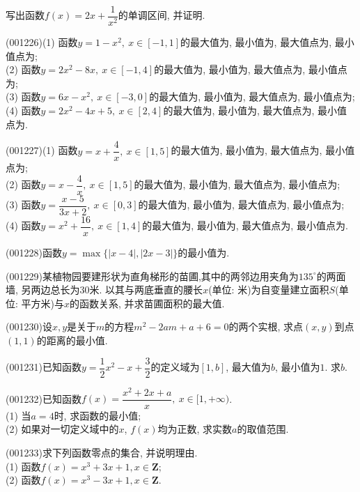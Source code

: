 写出函数$f(x)=2x+\dfrac{1}{x^2}$的单调区间, 并证明.
\item (001226)(1) 函数$y=1-x^2, \ x\in [-1,1]$的最大值为, 最小值为, 最大值点为, 最小值点为;\\ 
(2) 函数$y=2x^2-8x, \ x\in [-1,4]$的最大值为, 最小值为, 最大值点为, 最小值点为;\\ 
(3) 函数$y=6x-x^2, \ x\in [-3,0]$的最大值为, 最小值为, 最大值点为, 最小值点为;\\ 
(4) 函数$y=2x^2-4x+5, \ x\in [2,4]$的最大值为, 最小值为, 最大值点为, 最小值点为.
\item (001227)(1) 函数$y=x+\dfrac{4}{x}, \ x\in [1,5]$的最大值为, 最小值为, 最大值点为, 最小值点为;\\ 
(2) 函数$y=x-\dfrac{4}{x}, \ x\in [1,5]$的最大值为, 最小值为, 最大值点为, 最小值点为;\\ 
(3) 函数$y=\dfrac{x-5}{3x+2}, \ x\in [0,3]$的最大值为, 最小值为, 最大值点为, 最小值点为;\\ 
(4) 函数$y=x^2+\dfrac{16}{x}, \ x\in [1,4]$的最大值为, 最小值为, 最大值点为, 最小值点为.
\item (001228)函数$y=\max\{|x-4|,|2x-3|\}$的最小值为.
\item (001229)某植物园要建形状为直角梯形的苗圃,其中的两邻边用夹角为$135^\circ$的两面墙, 另两边总长为$30$米. 以其与两底垂直的腰长$x$(单位: 米)为自变量建立面积$S$(单位: 平方米)与$x$的函数关系, 并求苗圃面积的最大值.
\item (001230)设$x,y$是关于$m$的方程$m^2-2am+a+6=0$的两个实根, 求点$(x,y)$到点$(1,1)$的距离的最小值.
\item (001231)已知函数$y=\dfrac{1}{2}x^2-x+\dfrac{3}{2}$的定义域为$[1,b]$, 最大值为$b$, 最小值为$1$. 求$b$.
\item (001232)已知函数$f(x)=\dfrac{x^2+2x+a}{x}, \ x \in [1,+\infty)$.\\ 
(1) 当$a=4$时, 求函数的最小值;\\ 
(2) 如果对一切定义域中的$x$, $f(x)$均为正数, 求实数$a$的取值范围.
\item (001233)求下列函数零点的集合, 并说明理由.\\ 
(1) 函数$f(x)=x^3+3x+1,x\in\mathbf{Z}$;\\ 
(2) 函数$f(x)=x^3-3x+1,x\in\mathbf{Z}$.
